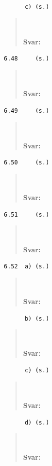 \documentclass[a4paper]{article}
\newcommand{\tskcol}[1]{\textcolor{tskcol}{#1}}
\begin{document}
	\texttt{\tskcol{~~~~~~c) (s.)}}
	\begin{quotation}
		\noindent
		\\ \\
		\textbf{Svar:}
	\end{quotation}
	
	\texttt{\tskcol{6.48~~~~ (s.)}}
	\begin{quotation}
		\noindent
		\\ \\
		\textbf{Svar:}
	\end{quotation}
	
	\texttt{\tskcol{6.49~~~~ (s.)}}
	\begin{quotation}
		\noindent
		\\ \\
		\textbf{Svar:}
	\end{quotation}
	
	\texttt{\tskcol{6.50~~~~ (s.)}}
	\begin{quotation}
		\noindent
		\\ \\
		\textbf{Svar:}
	\end{quotation}
	
	\texttt{\tskcol{6.51~~~~ (s.)}}
	\begin{quotation}
		\noindent
		\\ \\
		\textbf{Svar:}
	\end{quotation}
	
	\texttt{\tskcol{6.52~~a) (s.)}}
	\begin{quotation}
		\noindent
		\\ \\
		\textbf{Svar:}
	\end{quotation}
	
	\texttt{\tskcol{~~~~~~b) (s.)}}
	\begin{quotation}
		\noindent
		\\ \\
		\textbf{Svar:}
	\end{quotation}
	
	\texttt{\tskcol{~~~~~~c) (s.)}}
	\begin{quotation}
		\noindent
		\\ \\
		\textbf{Svar:}
	\end{quotation}
	
	\texttt{\tskcol{~~~~~~d) (s.)}}
	\begin{quotation}
		\noindent
		\\ \\
		\textbf{Svar:}
	\end{quotation}
	
\end{document}
